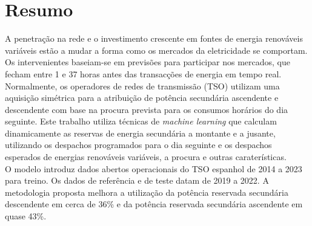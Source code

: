 \chapter{Resumo}

A penetração na rede e o investimento crescente em fontes de energia renováveis variáveis estão a mudar a forma como os mercados da eletricidade se comportam. Os intervenientes baseiam-se em previsões para participar nos mercados, que fecham entre 1 e 37 horas antes das transacções de energia em tempo real.\\
Normalmente, os operadores de redes de transmissão (TSO) utilizam uma aquisição simétrica para a atribuição de potência secundária ascendente e descendente com base na procura prevista para os consumos horários do dia seguinte. Este trabalho utiliza técnicas de \emph{machine learning} que calculam dinamicamente as reservas de energia secundária a montante e a jusante, utilizando os despachos programados para o dia seguinte e os despachos esperados de energias renováveis variáveis, a procura e outras caraterísticas.\\
O modelo introduz dados abertos operacionais do TSO espanhol de 2014 a 2023 para treino. Os dados de referência e de teste datam de 2019 a 2022. A metodologia proposta melhora a utilização da potência reservada secundária descendente em cerca de 36\% e da potência reservada secundária ascendente em quase 43\%. \\


\vspace{0.5cm} %

